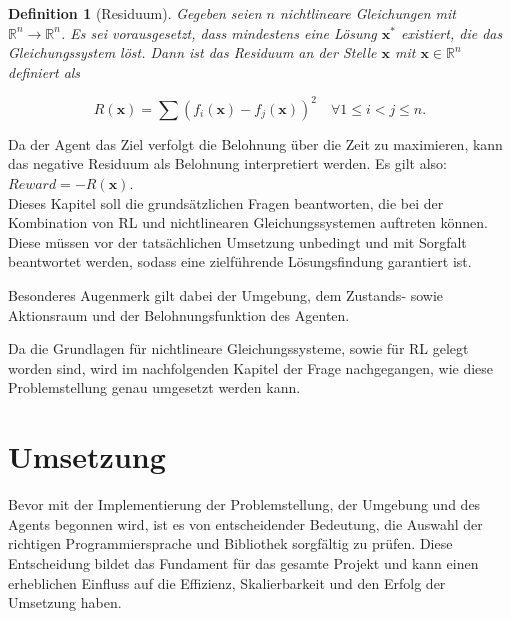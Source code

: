 \documentclass{article}
\theoremstyle{newline}
\newtheorem{definition}{Definition}[section]
\begin{document}
\begin{onehalfspace}
\begin{definition}[Residuum]
	Gegeben seien $n$ nichtlineare Gleichungen mit $\mathbb{R}^n \rightarrow \mathbb{R}^n$. Es sei vorausgesetzt, dass mindestens eine Lösung $\mathbf{x}^{\ast}$ existiert, die das Gleichungssystem löst. Dann ist das Residuum an der Stelle $\mathbf{x}$ mit $\mathbf{x} \in \mathbb{R}^n$ definiert als
	
	\begin{equation}
		R(\mathbf{x}) = \sum\limits (f_i(\mathbf{x}) - f_j(\mathbf{x}))^2 \quad \forall 1 \leq i < j \leq n.
	\end{equation}
\end{definition}

Da der Agent das Ziel verfolgt die Belohnung über die Zeit zu maximieren, kann das negative Residuum als Belohnung interpretiert werden. Es gilt also: $Reward = -R(\mathbf{x})$.
\\

Dieses Kapitel soll die grundsätzlichen Fragen beantworten, die bei der Kombination von RL und nichtlinearen Gleichungssystemen auftreten können. Diese müssen vor der tatsächlichen Umsetzung unbedingt und mit Sorgfalt beantwortet werden, sodass eine zielführende Lösungsfindung garantiert ist.

Besonderes Augenmerk gilt dabei der Umgebung, dem Zustands- sowie Aktionsraum und der Belohnungsfunktion des Agenten.

Da die Grundlagen für nichtlineare Gleichungssysteme, sowie für RL gelegt worden sind, wird im nachfolgenden Kapitel der Frage nachgegangen, wie diese Problemstellung genau umgesetzt werden kann.

\section{Umsetzung}

Bevor mit der Implementierung der Problemstellung, der Umgebung und des Agents begonnen wird, ist es von entscheidender Bedeutung, die Auswahl der richtigen Programmiersprache und Bibliothek sorgfältig zu prüfen. Diese Entscheidung bildet das Fundament für das gesamte Projekt und kann einen erheblichen Einfluss auf die Effizienz, Skalierbarkeit und den Erfolg der Umsetzung haben.
\medskip


\end{onehalfspace}
\end{document}
